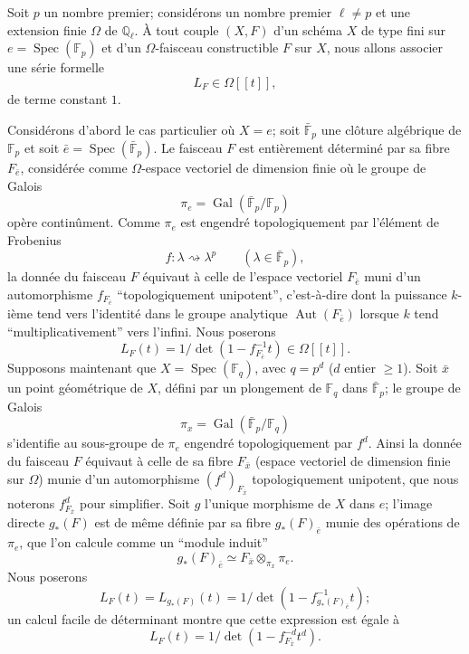 \documentclass[11pt]{article}
\DeclareMathOperator{\Spec}{Spec}
\providecommand{\Gal}{\operatorname{Gal}}
\providecommand{\Aut}{\operatorname{Aut}}
\providecommand{\Spec}{\operatorname{Spec}}
\providecommand{\Spec}{\operatorname{Spec}}
\providecommand{\Aut}{\operatorname{Aut}}
\providecommand{\Spec}{\operatorname{Spec}}
\providecommand{\Spec}{\operatorname{Spec}}
\providecommand{\Gal}{\operatorname{Gal}}
\begin{document}
Soit $p$ un nombre premier; considérons un nombre premier $\ell\ne p$ et une extension finie $\Omega$ de $\mathbb Q_\ell$. À tout couple $(X,F)$ d'un schéma $X$ de type fini sur $e=\Spec(\mathbb F_p)$ et d'un $\Omega$-faisceau constructible $F$ sur $X$, nous allons associer une série formelle
\[
L_F\in\Omega[[t]],
\]
de terme constant $1$.


Considérons d'abord le cas particulier où $X=e$; soit $\bar{\mathbb F}_p$ une clôture algébrique de $\mathbb F_p$ et soit $\bar e=\Spec(\bar{\mathbb F}_p)$. Le faisceau $F$ est entièrement déterminé par sa fibre $F_{\bar e}$, considérée comme $\Omega$-espace vectoriel de dimension finie où le groupe de Galois
\[
\pi_e=\Gal(\bar{\mathbb F}_p/\mathbb F_p)
\]
opère continûment. Comme $\pi_e$ est engendré topologiquement par l'élément de Frobenius
\[
f: \lambda\rightsquigarrow \lambda^p\qquad(\lambda\in\bar{\mathbb F}_p),
\]
la donnée du faisceau $F$ équivaut à celle de l'espace vectoriel $F_{\bar e}$ muni d'un automorphisme $f_{F_{\bar e}}$ ``topologiquement unipotent'', c'est-à-dire dont la puissance $k$-ième tend vers l'identité dans le groupe analytique $\Aut(F_{\bar e})$ lorsque $k$ tend ``multiplicativement'' vers l'infini. Nous poserons
\[
L_F(t)=1/\det(1-f_{F_{\bar e}}^{-1}t)\in\Omega[[t]].
\]
Supposons maintenant que $X=\Spec(\mathbb F_q)$, avec $q=p^d$ ($d$ entier $\ge1$). Soit $\bar x$ un point géométrique de $X$, défini par un plongement de $\mathbb F_q$ dans $\bar{\mathbb F}_p$; le groupe de Galois
\[
\pi_x=\Gal(\bar{\mathbb F}_p/\mathbb F_q)
\]
s'identifie au sous-groupe de $\pi_e$ engendré topologiquement par $f^d$. Ainsi la donnée du faisceau $F$ équivaut à celle de sa fibre $F_{\bar x}$ (espace vectoriel de dimension finie sur $\Omega$) munie d'un automorphisme $(f^d)_{F_{\bar x}}$ topologiquement unipotent, que nous noterons $f^d_{F_{\bar x}}$ pour simplifier. Soit $g$ l'unique morphisme de $X$ dans $e$; l'image directe $g_*(F)$ est de même définie par sa fibre $g_*(F)_{\bar e}$ munie des opérations de $\pi_e$, que l'on calcule comme un ``module induit''
\[
g_*(F)_{\bar e}\simeq F_{\bar x}\otimes_{\pi_x}\pi_e.
\]
Nous poserons
\[
L_F(t)=L_{g_*(F)}(t)=1/\det(1-f^{-1}_{g_*(F)_{\bar e}}t);
\]
un calcul facile de déterminant montre que cette expression est égale 
à
\[
L_F(t)=1/\det(1-f^{-d}_{F_{\bar x}}t^d).
\]
\end{document}
